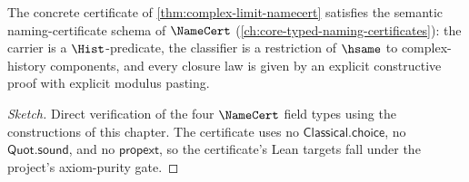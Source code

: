 \begin{theorem}
\label{thm:complex-limit-semantic-namecert}
The concrete certificate of \autoref{thm:complex-limit-namecert} satisfies the semantic naming-certificate schema of \(\NameCert\) (\autoref{ch:core-typed-naming-certificates}): the carrier is a \(\Hist\)-predicate, the classifier is a restriction of \(\hsame\) to complex-history components, and every closure law is given by an explicit constructive proof with explicit modulus pasting.
\end{theorem}
\begin{proof}[Sketch]
Direct verification of the four \(\NameCert\) field types using the constructions of this chapter. The certificate uses no \(\mathsf{Classical.choice}\), no \(\mathsf{Quot.sound}\), and no \(\mathsf{propext}\), so the certificate's Lean targets fall under the project's axiom-purity gate.
\end{proof}

